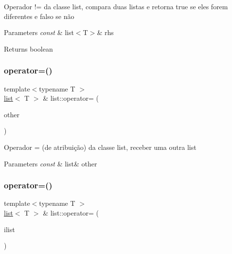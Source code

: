 Operador != da classe list, compara duas listas e retorna true se eles forem diferentes e falso se não 
\begin{DoxyParams}{Parameters}
{\em const} & list$<$\+T$>$\& rhs \\
\hline
\end{DoxyParams}
\begin{DoxyReturn}{Returns}
boolean 
\end{DoxyReturn}
\mbox{\label{classsc_1_1list_a09a75038c91f224b930fc63b39c4ad56}} 
\subsubsection{\texorpdfstring{operator=()}{operator=()}\hspace{0.1cm}{\footnotesize\ttfamily [1/2]}}
{\footnotesize\ttfamily template$<$typename T $>$ \\
\mbox{\hyperlink{classsc_1_1list}{list}}$<$ T $>$ \& list\+::operator= (\begin{DoxyParamCaption}\item[{const \mbox{\hyperlink{classsc_1_1list}{list}}$<$ T $>$ \&}]{other }\end{DoxyParamCaption})}

Operador = (de atribuição) da classe list, receber uma outra list 
\begin{DoxyParams}{Parameters}
{\em const} & list\& other \\
\hline
\end{DoxyParams}
\mbox{\label{classsc_1_1list_a480d22198a20823cf386bc3caef22cae}} 
\subsubsection{\texorpdfstring{operator=()}{operator=()}\hspace{0.1cm}{\footnotesize\ttfamily [2/2]}}
{\footnotesize\ttfamily template$<$typename T $>$ \\
\mbox{\hyperlink{classsc_1_1list}{list}}$<$ T $>$ \& list\+::operator= (\begin{DoxyParamCaption}\item[{std\+::initializer\+\_\+list$<$ T $>$}]{ilist }\end{DoxyParamCaption})}

